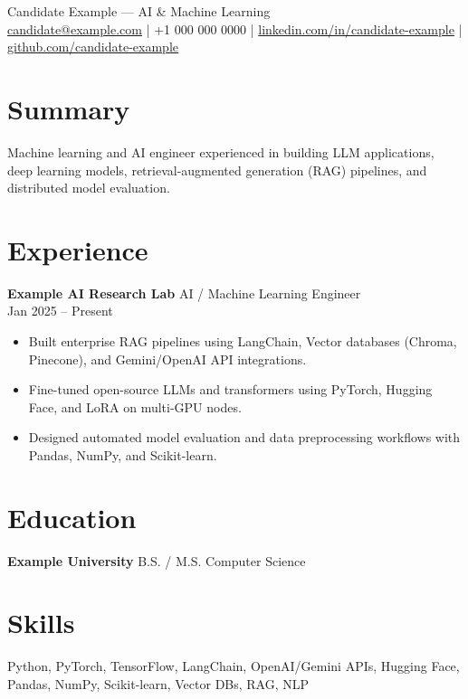 \documentclass[10pt]{article}
\begin{document}
\begin{center}
{\LARGE Candidate Example — AI \& Machine Learning}\\
\href{mailto:candidate@example.com}{candidate@example.com} |
+1 000 000 0000 |
\href{https://www.linkedin.com/in/candidate-example}{linkedin.com/in/candidate-example} |
\href{https://github.com/candidate-example}{github.com/candidate-example}
\end{center}

\section*{Summary}
Machine learning and AI engineer experienced in building LLM applications, deep learning models, retrieval-augmented generation (RAG) pipelines, and distributed model evaluation.

\section*{Experience}
\textbf{Example AI Research Lab} \hfill AI / Machine Learning Engineer \\
Jan 2025 -- Present
\begin{itemize}
  \item Built enterprise RAG pipelines using LangChain, Vector databases (Chroma, Pinecone), and Gemini/OpenAI API integrations.
  \item Fine-tuned open-source LLMs and transformers using PyTorch, Hugging Face, and LoRA on multi-GPU nodes.
  \item Designed automated model evaluation and data preprocessing workflows with Pandas, NumPy, and Scikit-learn.
\end{itemize}

\section*{Education}
\textbf{Example University} \hfill B.S. / M.S. Computer Science

\section*{Skills}
Python, PyTorch, TensorFlow, LangChain, OpenAI/Gemini APIs, Hugging Face, Pandas, NumPy, Scikit-learn, Vector DBs, RAG, NLP
\end{document}
